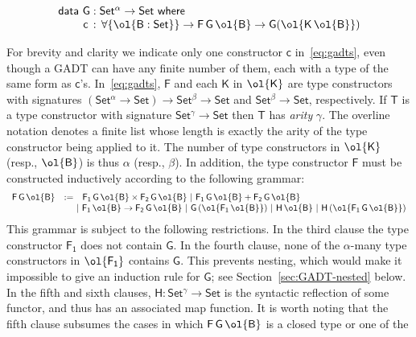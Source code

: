 \documentclass[sigplan,10pt]{acmart}
\begin{document}
\vspace*{-0.05in}

\begin{equation}\label{eq:gadts}
\begin{array}{l}
  \mathsf{data\ G : Set^\alpha
    \to Set\ where}\\
\mathsf{\;\;\;\;\;\;\;\;c\, :\, \forall \{\ol{B : Set}\} \to F\,G\,\ol{B} \to G (\ol{K\,\ol{B}})}
\end{array}
\end{equation}

\noindent
For brevity and clarity we indicate only one constructor $\mathsf{c}$
in~\eqref{eq:gadts}, even though a GADT can have any finite number of
them, each with a type of the same form as
$\mathsf{c}$'s. In~\eqref{eq:gadts}, $\mathsf{F}$ and each
$\mathsf{K}$ in $\ol{\mathsf{K}}$ are type constructors with
signatures $\mathsf{(Set^{\alpha} \to Set) \to Set^{\beta} \to Set}$
and $\mathsf{Set^{\beta} \to Set}$, respectively. If $\mathsf{T}$ is a
type constructor with signature $\mathsf{Set^{\gamma} \to Set}$ then
$\mathsf{T}$ has {\em arity} $\mathsf{\gamma}$.  The
overline notation denotes a finite list whose length is exactly the
arity of the type constructor being applied to it. The number of type
constructors in $\ol{\mathsf{K}}$ (resp., $\ol{\mathsf{B}}$) is thus
$\alpha$ (resp., $\beta$). In addition, the type constructor
$\mathsf{F}$ must be constructed inductively according to the
following grammar:\label{grammar}
\[\begin{array}{lll}
\mathsf{F\,G\,\ol{B}} & := &
\mathsf{F_1\,G\,\ol{B} \times F_2\,G\,\ol{B} \ \vert\ F_1\,G\,\ol{B} +
  F_2\,G\,\ol{B}}\\
& & \!\!\!\!\mathsf{\vert\ F_1\,\ol{B} \to F_2\,G\,\ol{B}
\ \vert\ G\,(\ol{F_1\,\ol{B}}) \ \vert\ H\,\ol{B} \ \vert\ H\,
(\ol{F_1\,G\,\ol{B}}) }
\end{array}\]
This grammar is subject to the following restrictions. In the third
clause the type constructor $\mathsf{F_1}$ does not contain
$\mathsf{G}$. In the fourth clause, none of the $\mathsf{\alpha}$-many
type constructors in $\mathsf{\ol{F_1}}$ contains $\mathsf{G}$. This
prevents nesting, which would make it impossible to give an induction
rule for $\mathsf{G}$; see Section~\ref{sec:GADT-nested} below. In the
fifth and sixth clauses, $\mathsf{H : Set^\gamma \to Set}$ is the
syntactic reflection of some functor, and thus has an associated map
function. It is worth noting that the fifth clause subsumes the cases
in which $\mathsf{F\,G\,\ol{B}}$ is a closed type or one of the
\end{document}
